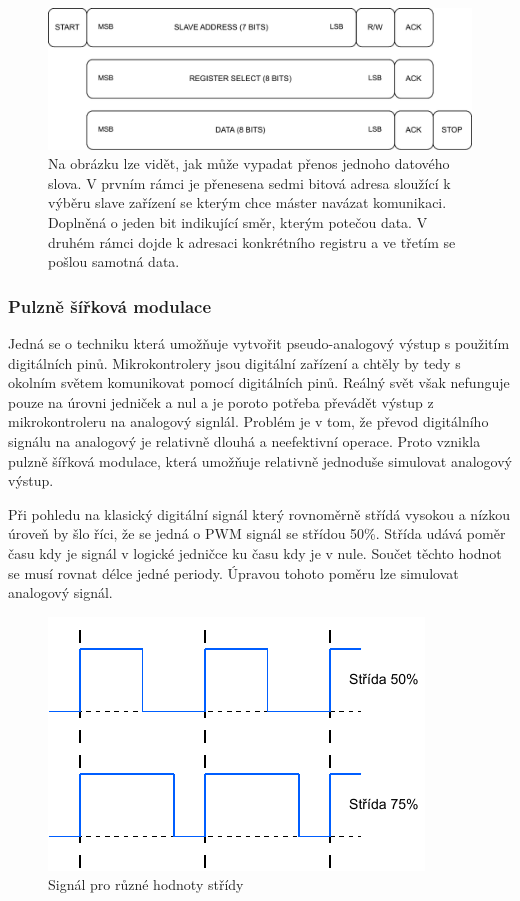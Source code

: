 \begin{figure}[h!]
	\centering
	\includegraphics[scale=0.75]{obrazky-figures/i2c_data_word.pdf}
	\caption{Na obrázku lze vidět, jak může vypadat přenos jednoho datového slova. V prvním rámci je přenesena sedmi bitová adresa sloužící k výběru slave zařízení se kterým chce máster navázat komunikaci. Doplněná o jeden bit indikující směr, kterým potečou data. V druhém rámci dojde k adresaci konkrétního registru a ve třetím se pošlou samotná data. \cite{an4481}}
	\label{}
\end{figure}

\subsubsection*{Pulzně šířková modulace}
Jedná se o techniku která umožňuje vytvořit pseudo-analogový výstup s použitím digitálních pinů. Mikrokontrolery jsou digitální zařízení a chtěly by tedy s okolním světem komunikovat pomocí digitálních pinů. Reálný svět však nefunguje pouze na úrovni jedniček a nul a je poroto potřeba převádět výstup z mikrokontroleru na analogový signlál. Problém je v tom, že převod digitálního signálu na analogový je relativně dlouhá a neefektivní operace. Proto vznikla pulzně šířková modulace, která umožňuje relativně jednoduše simulovat analogový výstup.

Při pohledu na klasický digitální signál který rovnoměrně střídá vysokou a nízkou úroveň by šlo říci, že se jedná o PWM signál se střídou 50\%. Střída udává poměr času kdy je signál v logické jedničce ku času kdy je v nule. Součet těchto hodnot se musí rovnat délce jedné periody. Úpravou tohoto poměru lze simulovat analogový signál.

\begin{figure}[h!]
	\centering
	\includegraphics[scale=1]{obrazky-figures/pwm_duty_cycle.pdf}
	\caption{Signál pro různé hodnoty střídy}
	\label{}
\end{figure}

